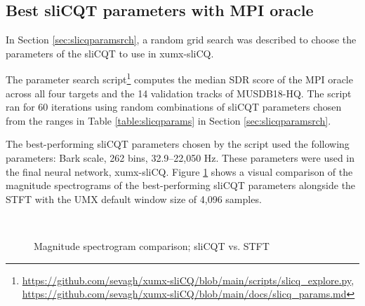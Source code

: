 \documentclass[report.tex]{subfiles}
\begin{document}
\subsection{Best sliCQT parameters with MPI oracle}
\label{sec:slicqparamresults}

In Section \ref{sec:slicqparamsrch}, a random grid search was described to choose the parameters of the sliCQT to use in xumx-sliCQ.

The parameter search script\footnote{\url{https://github.com/sevagh/xumx-sliCQ/blob/main/scripts/slicq_explore.py}, \url{https://github.com/sevagh/xumx-sliCQ/blob/main/docs/slicq_params.md}} computes the median SDR score of the MPI oracle across all four targets and the 14 validation tracks of MUSDB18-HQ. The script ran for 60 iterations using random combinations of sliCQT parameters chosen from the ranges in Table \ref{table:slicqparams} in Section \ref{sec:slicqparamsrch}.

The best-performing sliCQT parameters chosen by the script used the following parameters: Bark scale, 262 bins, 32.9--22,050 Hz. These parameters were used in the final neural network, xumx-sliCQ. Figure \ref{fig:bipolarslicqs} shows a visual comparison of the magnitude spectrograms of the best-performing sliCQT parameters alongside the STFT with the UMX default window size of 4,096 samples.

\begin{figure}[ht]
	\centering
	\\
	\caption{Magnitude spectrogram comparison; sliCQT vs. STFT}
	\label{fig:bipolarslicqs}
\end{figure}
\end{document}
